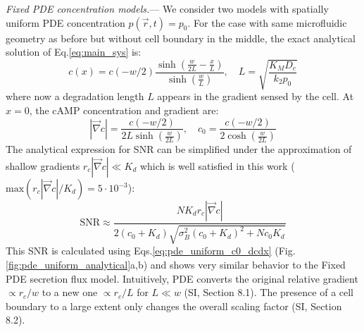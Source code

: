\documentclass[%
 reprint,
 amsmath,amssymb,
 aps,prl,
 showpacs,
 linenumbers
]{revtex4-1}
\begin{document}
%
%
%
%
\emph{Fixed PDE concentration models.}--- We consider two models with spatially uniform PDE concentration $p(\vec{r},t) = p_0$. For the case with same microfluidic geometry as before but without cell boundary in the middle, the exact analytical solution of Eq.\ref{eq:main_sys} is:
\begin{equation}
	c(x) = c(-w/2) \frac{\sinh\left(\frac{w}{2L}-\frac{x}{L}\right)}
		{\sinh\left(\frac{w}{L}\right)},\quad L=\sqrt{\frac{K_M D_c}{k_2p_0}}
	\label{eq:uniform_pde_analytic_sol}
\end{equation}
where now a degradation length $L$ appears in the gradient sensed by the cell. At $x = 0$, the cAMP concentration and gradient are:
\begin{equation}
	|\vec{\nabla} c| = \frac{c(-w/2)}{2L\sinh\left(\frac{w}{2L}\right)},\quad 
	c_0 = \frac{c(-w/2)}{2\cosh\left(\frac{w}{2L}\right)}
	\label{eq:pde_uniform_c0_dcdx}
\end{equation}
The analytical expression for SNR can be simplified under the approximation of shallow gradients $r_c|\vec{\nabla}c| \ll K_d$ which is well satisfied in this work ($\mathrm{max}(r_c|\vec{\nabla}c|/K_d) = 5\cdot10^{-3}$):
\begin{equation}
	\mathrm{SNR} \approx \frac{N K_d r_c |\vec{\nabla}c|}{2(c_0 + K_d)\sqrt{\sigma_B^2(c_0 + K_d)^2 + N c_0 K_d}}
	\label{eq:pde_uniform_snr}
\end{equation}
This SNR is calculated using Eqs.\ref{eq:pde_uniform_c0_dcdx} (Fig.\ref{fig:pde_uniform_analytical}a,b) and shows very similar behavior to the Fixed PDE secretion flux model. Intuitively, PDE converts the original relative gradient $\propto r_c/w$ to a new one $\propto r_c/L$ for $L \ll w$ (SI, Section 8.1). The presence of a cell boundary to a large extent only changes the overall scaling factor (SI, Section 8.2).
%
%
\end{document}
